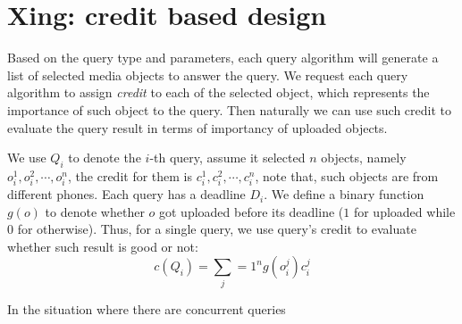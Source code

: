 \section{Xing: credit based design}
Based on the query type and parameters, each query algorithm will generate a list of selected media objects to answer the query. We request each query algorithm to assign \textit{credit} to each of the selected object, which represents the importance of such object to the query. Then naturally we can use such credit to evaluate the query result in terms of importancy of uploaded objects. 

We use $Q_i$ to denote the $i$-th query, assume it selected $n$ objects, namely $o_i^1, o_i^2, \cdots, o_i^n$, the credit for them is $c_i^1, c_i^2, \cdots, c_i^n$, note that, such objects are from different phones. Each query has a deadline $D_i$. We define a binary function $g(o)$ to denote whether $o$ got uploaded before its deadline ($1$ for uploaded while $0$ for otherwise). Thus, for a single query, we use query's credit to evaluate whether such result is good or not:
$$c(Q_i)=\sum_j=1^n g(o_i^j)c_i^j$$ 

In the situation where there are concurrent queries 



